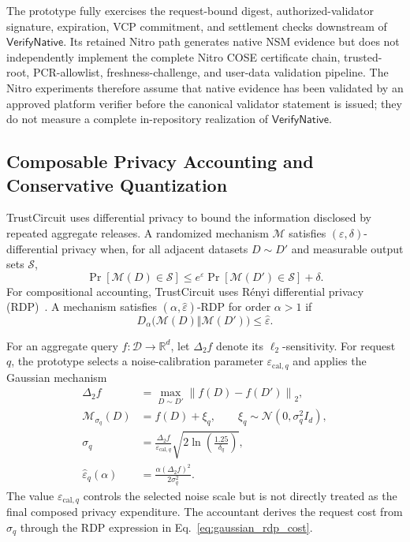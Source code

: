 \documentclass[10pt,journal,compsoc]{IEEEtran}
\begin{document}
The prototype fully exercises the request-bound digest, authorized-validator signature, expiration, VCP commitment, and settlement checks downstream of $\mathsf{VerifyNative}$. Its retained Nitro path generates native NSM evidence but does not independently implement the complete Nitro COSE certificate chain, trusted-root, PCR-allowlist, freshness-challenge, and user-data validation pipeline. The Nitro experiments therefore assume that native evidence has been validated by an approved platform verifier before the canonical validator statement is issued; they do not measure a complete in-repository realization of $\mathsf{VerifyNative}$.

\subsection{Composable Privacy Accounting and Conservative Quantization}
\label{subsec:dp_budgeting}

TrustCircuit uses differential privacy to bound the information disclosed by repeated aggregate releases. A randomized mechanism $\mathcal{M}$ satisfies $(\varepsilon,\delta)$-differential privacy when, for all adjacent datasets $D\sim D'$ and measurable output sets $\mathcal{S}$,
\begin{equation}
\Pr[\mathcal{M}(D)\in\mathcal{S}]
\leq
e^\varepsilon
\Pr[\mathcal{M}(D')\in\mathcal{S}]
+
\delta.
\label{eq:dp_definition}
\end{equation}
For compositional accounting, TrustCircuit uses R\'enyi differential privacy (RDP)~\cite{mironov2017renyi}. A mechanism satisfies $(\alpha,\widehat{\varepsilon})$-RDP for order $\alpha>1$ if
\begin{equation}
D_{\alpha}
\bigl(
\mathcal{M}(D)
\Vert
\mathcal{M}(D')
\bigr)
\leq
\widehat{\varepsilon}.
\label{eq:rdp_definition}
\end{equation}

For an aggregate query $f:\mathcal{D}\rightarrow\mathbb{R}^{d}$, let $\Delta_2f$ denote its $\ell_2$-sensitivity. For request $q$, the prototype selects a noise-calibration parameter $\varepsilon_{\mathrm{cal},q}$ and applies the Gaussian mechanism
\begin{equation}
\begin{aligned}
\Delta_2 f
&=
\max_{D\sim D'}
\left\|
f(D)-f(D')
\right\|_2,\\
\mathcal{M}_{\sigma_q}(D)
&=
f(D)+\xi_q,
\qquad
\xi_q
\sim
\mathcal{N}(0,\sigma_q^2I_d),\\
\sigma_q
&=
\frac{\Delta_2 f}{
\varepsilon_{\mathrm{cal},q}
}
\sqrt{
2\ln
\left(
\frac{1.25}{\delta_q}
\right)
},\\
\widehat{\varepsilon}_{q}(\alpha)
&=
\frac{
\alpha(\Delta_2f)^2
}{
2\sigma_q^2
}.
\end{aligned}
\label{eq:gaussian_rdp_cost}
\end{equation}
The value $\varepsilon_{\mathrm{cal},q}$ controls the selected noise scale but is not directly treated as the final composed privacy expenditure. The accountant derives the request cost from $\sigma_q$ through the RDP expression in Eq.~\eqref{eq:gaussian_rdp_cost}.
\end{document}
